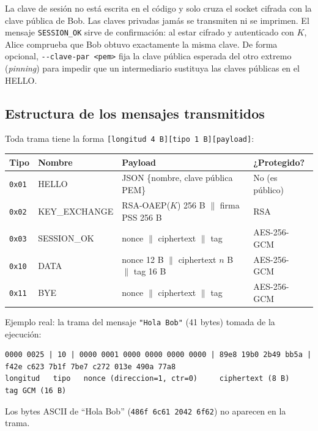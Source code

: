 \documentclass[11pt,a4paper]{article}
\begin{document}
La clave de sesión no está escrita en el código y solo cruza el socket cifrada con la clave
pública de Bob. Las claves privadas jamás se transmiten ni se imprimen. El mensaje
\texttt{SESSION\_OK} sirve de confirmación: al estar cifrado y autenticado con $K$, Alice
comprueba que Bob obtuvo exactamente la misma clave. De forma opcional,
\texttt{-{}-clave-par <pem>} fija la clave pública esperada del otro extremo (\emph{pinning}) para
impedir que un intermediario sustituya las claves públicas en el HELLO.

\subsection{Estructura de los mensajes transmitidos}

Toda trama tiene la forma \texttt{[longitud 4 B][tipo 1 B][payload]}:

\begin{center}
\begin{tabular}{@{}llll@{}}
\toprule
\textbf{Tipo} & \textbf{Nombre} & \textbf{Payload} & \textbf{¿Protegido?} \\ \midrule
\texttt{0x01} & HELLO        & JSON \{nombre, clave pública PEM\} & No (es público) \\
\texttt{0x02} & KEY\_EXCHANGE & RSA-OAEP($K$) 256 B $\|$ firma PSS 256 B & RSA \\
\texttt{0x03} & SESSION\_OK   & nonce $\|$ ciphertext $\|$ tag & AES-256-GCM \\
\texttt{0x10} & DATA         & nonce 12 B $\|$ ciphertext $n$ B $\|$ tag 16 B & AES-256-GCM \\
\texttt{0x11} & BYE          & nonce $\|$ ciphertext $\|$ tag & AES-256-GCM \\
\bottomrule
\end{tabular}
\end{center}

Ejemplo real: la trama del mensaje \texttt{"Hola Bob"} (41 bytes) tomada de la ejecución:

\begin{lstlisting}[basicstyle=\ttfamily\tiny,columns=fullflexible,keepspaces=true]
0000 0025 | 10 | 0000 0001 0000 0000 0000 0000 | 89e8 19b0 2b49 bb5a | f42e c623 7b1f 7be7 c272 013e 490a 77a8
longitud   tipo   nonce (direccion=1, ctr=0)     ciphertext (8 B)      tag GCM (16 B)
\end{lstlisting}

Los bytes ASCII de ``Hola Bob'' (\texttt{486f 6c61 2042 6f62}) no aparecen en la trama.
\end{document}
